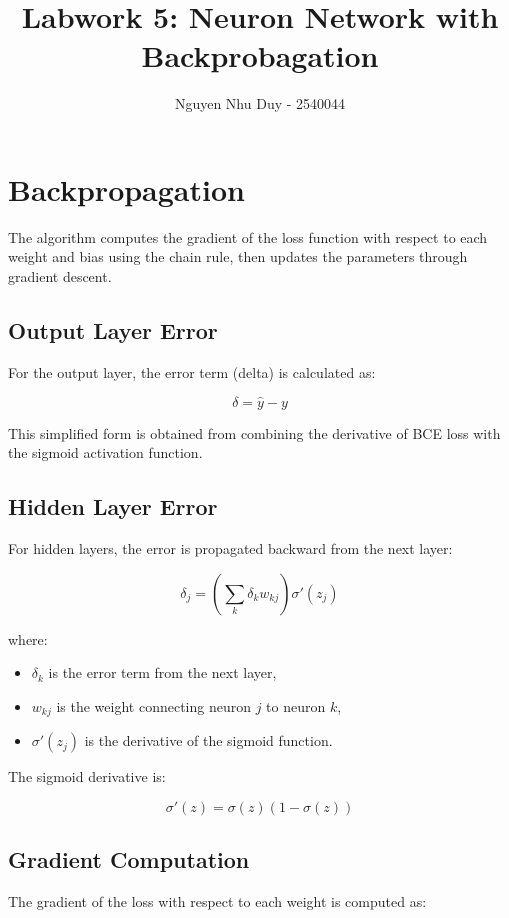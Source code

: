 \documentclass{article}
\title{Labwork 5: Neuron Network with Backprobagation}
\author{Nguyen Nhu Duy - 2540044}
\begin{document}
\setlength{\parindent}{0pt}
\maketitle
\section{Backpropagation}

The algorithm computes the gradient of the loss function with respect to each weight and bias using the chain rule, then updates the parameters through gradient descent.

\subsection{Output Layer Error}

For the output layer, the error term (delta) is calculated as:

\[
\delta = \hat{y} - y
\]

This simplified form is obtained from combining the derivative of BCE loss with the sigmoid activation function.

\subsection{Hidden Layer Error}

For hidden layers, the error is propagated backward from the next layer:

\[
\delta_j = \left( \sum_k \delta_k w_{kj} \right)\sigma'(z_j)
\]

where:
\begin{itemize}
    \item $\delta_k$ is the error term from the next layer,
    \item $w_{kj}$ is the weight connecting neuron $j$ to neuron $k$,
    \item $\sigma'(z_j)$ is the derivative of the sigmoid function.
\end{itemize}

The sigmoid derivative is:

\[
\sigma'(z) = \sigma(z)(1-\sigma(z))
\]

\subsection{Gradient Computation}

The gradient of the loss with respect to each weight is computed as:
\end{document}
